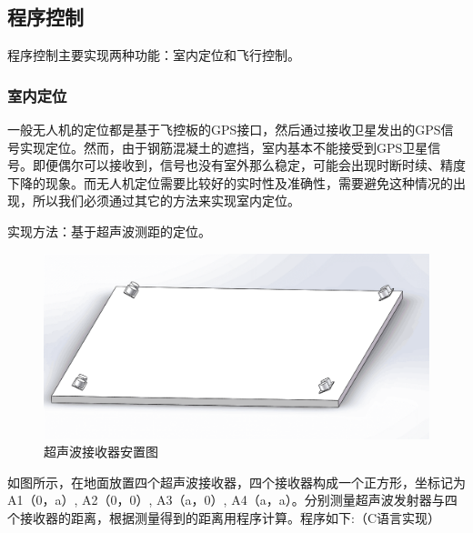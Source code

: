 \documentclass{ctexart}
\begin{document}
\subsection{程序控制}
程序控制主要实现两种功能：室内定位和飞行控制。
\subsubsection{室内定位}
一般无人机的定位都是基于飞控板的GPS接口，然后通过接收卫星发出的GPS信号实现定位。然而，由于钢筋混凝土的遮挡，室内基本不能接受到GPS卫星信号。即便偶尔可以接收到，信号也没有室外那么稳定，可能会出现时断时续、精度下降的现象。而无人机定位需要比较好的实时性及准确性，需要避免这种情况的出现，所以我们必须通过其它的方法来实现室内定位。\par
实现方法：基于超声波测距的定位。\par
\begin{figure}[H]
\centering
    \includegraphics[width = \textwidth]{039}
    \caption{超声波接收器安置图}\par
\end{figure}
如图所示，在地面放置四个超声波接收器，四个接收器构成一个正方形，坐标记为A1（0，a）, A2（0，0）, A3（a，0）, A4（a，a）。分别测量超声波发射器与四个接收器的距离，根据测量得到的距离用程序计算。程序如下:（C语言实现）
\end{document}
